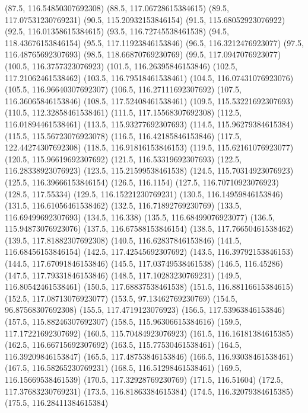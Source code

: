 {{{		(87.5, 116.54850307692308)
		(88.5, 117.06728615384615)
		(89.5, 117.07531230769231)
		(90.5, 115.20932153846154)
		(91.5, 115.68052923076922)
		(92.5, 116.01358615384615)
		(93.5, 116.72745538461538)
		(94.5, 118.43676153846154)
		(95.5, 117.11923846153846)
		(96.5, 116.3212476923077)
		(97.5, 116.48765692307693)
		(98.5, 118.66870769230769)
		(99.5, 117.0947076923077)
		(100.5, 116.3757323076923)
		(101.5, 116.26395846153846)
		(102.5, 117.21062461538462)
		(103.5, 116.79518461538461)
		(104.5, 116.07431076923076)
		(105.5, 116.96640307692307)
		(106.5, 116.27111692307692)
		(107.5, 116.36065846153846)
		(108.5, 117.52408461538461)
		(109.5, 115.53221692307693)
		(110.5, 112.32858461538461)
		(111.5, 117.15568307692308)
		(112.5, 116.01894461538461)
		(113.5, 115.93277692307693)
		(114.5, 115.96279384615384)
		(115.5, 115.56723076923078)
		(116.5, 116.42185846153846)
		(117.5, 122.44274307692308)
		(118.5, 116.91816153846153)
		(119.5, 115.62161076923077)
		(120.5, 115.96619692307692)
		(121.5, 116.53319692307693)
		(122.5, 116.28338923076923)
		(123.5, 115.21599538461538)
		(124.5, 115.70314923076923)
		(125.5, 116.39666153846154)
		(126.5, 116.1154)
		(127.5, 116.70710923076923)
		(128.5, 117.55334)
		(129.5, 116.15221230769231)
		(130.5, 116.14959846153846)
		(131.5, 116.61056461538462)
		(132.5, 116.71892769230769)
		(133.5, 116.69499692307693)
		(134.5, 116.338)
		(135.5, 116.68499076923077)
		(136.5, 115.94873076923076)
		(137.5, 116.67588153846154)
		(138.5, 117.76650461538462)
		(139.5, 117.81882307692308)
		(140.5, 116.62837846153846)
		(141.5, 116.68456153846154)
		(142.5, 117.42545692307692)
		(143.5, 116.39792153846153)
		(144.5, 117.67091846153846)
		(145.5, 117.03749538461538)
		(146.5, 116.45286)
		(147.5, 117.79331846153846)
		(148.5, 117.10283230769231)
		(149.5, 116.80542461538461)
		(150.5, 117.68837538461538)
		(151.5, 116.88116615384615)
		(152.5, 117.08713076923077)
		(153.5, 97.13462769230769)
		(154.5, 96.87568307692308)
		(155.5, 117.4719123076923)
		(156.5, 117.53963846153846)
		(157.5, 115.88246307692307)
		(158.5, 115.96306615384616)
		(159.5, 117.17221692307692)
		(160.5, 115.70484923076923)
		(161.5, 116.16181384615385)
		(162.5, 116.66715692307692)
		(163.5, 115.77530461538461)
		(164.5, 116.39209846153847)
		(165.5, 117.48753846153846)
		(166.5, 116.93038461538461)
		(167.5, 116.58265230769231)
		(168.5, 116.51298461538461)
		(169.5, 116.15669538461539)
		(170.5, 117.32928769230769)
		(171.5, 116.51604)
		(172.5, 117.37683230769231)
		(173.5, 116.81863384615384)
		(174.5, 116.32079384615385)
		(175.5, 116.28411384615384)
}}}
